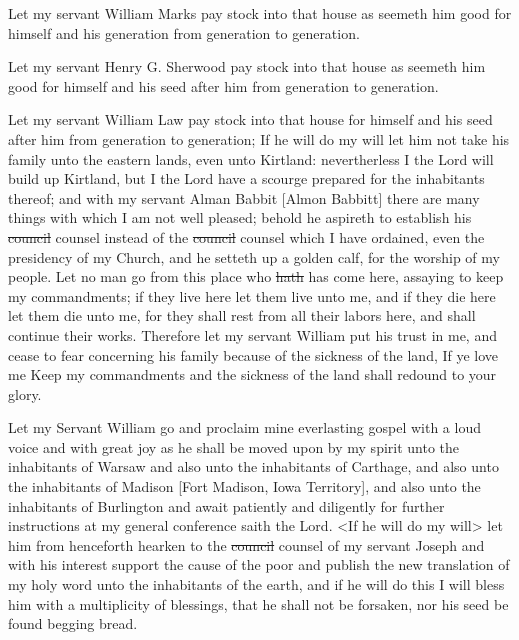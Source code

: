 				Let my servant William Marks pay stock into that house as seemeth him good for himself and his generation from generation to generation.

				Let my servant Henry G. Sherwood pay stock into that house as seemeth him good for himself and his seed after him from generation to generation.

				Let my servant William Law pay stock into that house for himself and his seed after him from generation to generation; If he will do my will let him not take his family unto the eastern lands, even unto Kirtland: nevertherless I the Lord will build up Kirtland, but I the Lord have a scourge prepared for the inhabitants thereof; and with my servant Alman Babbit [Almon Babbitt] there are many things with which I am not well pleased; behold he aspireth to establish his \sout{council} counsel instead of the \sout{council} counsel which I have ordained, even the presidency of my Church, and he setteth up a golden calf, for the worship of my people. Let no man go from this place who \sout{hath} has come here, assaying to keep my commandments; if they live here let them live unto me, and if they die here let them die unto me, for they shall rest from all their labors here, and shall continue their works. Therefore let my servant William put his trust in me, and cease to fear concerning his family because of the sickness of the land, If ye love me Keep my commandments and the sickness of the land shall redound to your glory.

				Let my Servant William go and proclaim mine everlasting gospel with a loud voice and with great joy as he shall be moved upon by my spirit unto the inhabitants of Warsaw and also unto the inhabitants of Carthage, and also unto the inhabitants of Madison [Fort Madison, Iowa Territory], and also unto the inhabitants of Burlington and await patiently and diligently for further instructions at my general conference saith the Lord. <If he will do my will> let him from henceforth hearken to the \sout{council} counsel of my servant Joseph and with his interest support the cause of the poor and publish the new translation of my holy word unto the inhabitants of the earth, and if he will do this I will bless him with a multiplicity of blessings, that he shall not be forsaken, nor his seed be found begging bread.


